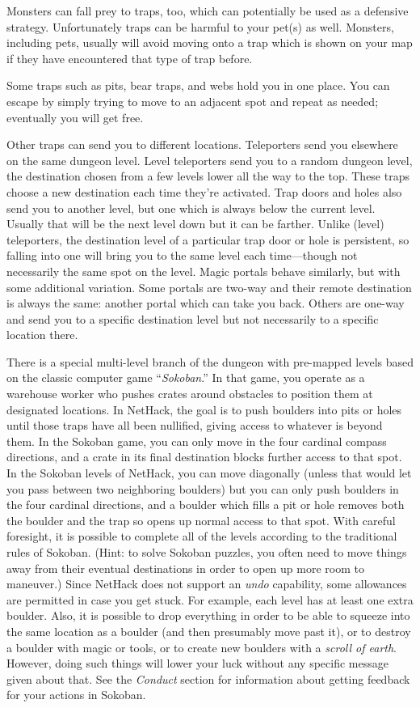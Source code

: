 Monsters can fall prey to
traps, too, which can potentially be used as a defensive strategy.
Unfortunately traps can be harmful to your pet(s) as well.
Monsters, including pets, usually will avoid moving onto a trap which
is shown on your map if they have encountered that type of trap before.

Some traps such as pits, bear traps, and webs hold you in one place.
You can escape by simply trying to move to an adjacent spot and repeat
as needed; eventually you will get free.

Other traps can send you to different locations.
Teleporters send you elsewhere on the same dungeon level.
Level teleporters send you to a random dungeon level, the destination
chosen from a few levels lower all the way to the top.
These traps choose a new destination each time they're activated.
Trap doors and holes also send you to another level, but one which is
always below the current level.
Usually that will be the next level down but it can be farther.
Unlike (level) teleporters, the destination level of a particular trap door
or hole is persistent, so falling into one will bring you to the same level
each time---though not necessarily the same spot on the level.
Magic portals behave similarly, but with some additional variation.
Some portals are two-way and their remote destination is always the same:
another portal which can take you back.
Others are one-way and send you to a specific destination level but not
necessarily to a specific location there.

There is a special multi-level branch of the dungeon with pre-mapped levels
based on the classic computer game ``{\it Sokoban}.''
In that game, you operate as a warehouse worker who pushes crates around
obstacles to position them at designated locations.
In NetHack, the goal is to push boulders into pits or holes until those
traps have all been nullified, giving access to whatever is beyond them.
In the Sokoban game, you can only move in the four cardinal compass
directions, and a crate in its final destination blocks further access
to that spot.
In the Sokoban levels of NetHack, you can move diagonally (unless that
would let you pass between two neighboring boulders) but you can only
push boulders in the four cardinal directions, and a boulder which fills
a pit or hole removes both the boulder and the trap so opens up normal
access to that spot.
With careful foresight, it is possible to complete all of the levels
according to the traditional rules of Sokoban.
(Hint: to solve Sokoban puzzles, you often need to move things away from
their eventual destinations in order to open up more room to maneuver.)
Since NetHack does not support an {\it undo\/} capability, some allowances
are permitted in case you get stuck.
For example, each level has at least one extra boulder.
Also, it is possible to drop everything in order to be able to squeeze
into the same location as a boulder (and then presumably move past it),
or to destroy a boulder with magic or tools, or to create new boulders
with a {\it scroll of earth}.
However, doing such things will lower your luck without any specific
message given about that.
See the {\it Conduct\/} section for information about getting feedback for
your actions in Sokoban.

